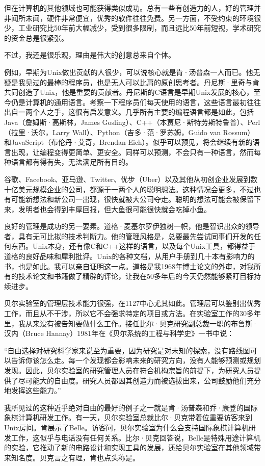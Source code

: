 \documentclass[a4paper,12pt,UTF8,twoside]{ctexbook}
\begin{document}
{{但在计算机的其他领域也可能获得类似成功。总有一些有创造力的人，好的管理并非闻所未闻，硬件非常便宜，优秀的软件往往免费。另一方面，不受约束的环境很少，工业研究比50年前大幅减少，受到很多限制，而且远比50年前短视，学术研究的资金总是很紧张。

不过，我还是很乐观，理由是伟大的创意总来自个体。

例如，早期为Unix做出贡献的人很少，可以说核心就是肯·汤普森一人而已。他无疑是我见过的最棒的程序员，也是无人可以比肩的原创思考者。丹尼斯·里奇与肯共同创造了Unix，他是重要的贡献者。丹尼斯的C语言是早期Unix发展的核心，至今仍是计算机的通用语言。考察一下程序员们每天使用的语言，这些语言最初往往出自一两个人之手，这很有启发意义。几乎所有主要的编程语言都是如此，包括Java（詹姆斯·高斯林，James Gosling）、C++（本贾尼·斯特劳斯特鲁普）、Perl（拉里·沃尔，Larry Wall）、Python（吉多·范·罗苏姆，Guido van Rossum）和JavaScript（布伦丹·艾奇，Brendan Eich）。似乎可以预见，将会继续有新的语言出现，让编程变得更简单、更安全。同样可以预测，不会只有一种语言，然而每种语言都有得有失，无法满足所有目的。

谷歌、Facebook、亚马逊、Twitter、优步（Uber）以及其他从初创企业发展到数十亿美元规模企业的公司，都源于一两个人的聪明想法。这种情况会更多，不过也有可能新想法和新公司一出现，很快就被大公司夺走。聪明的想法可能会被保留下来，发明者也会得到丰厚回报，但大鱼很可能很快就会吃掉小鱼。

良好的管理是成功的另一要素。道格·麦基尔罗伊独树一帜，他是智识出众的领导者，具有无可比拟的技术判断力。他的管理风格是，总要最先尝试同事们开发的任何东西。Unix本身，还有像C和C++这样的语言，以及每个Unix工具，都得益于道格的良好品味和犀利批评。Unix的各种文档，从用户手册到几十本有影响力的书，也是如此。我可以亲自证明这一点。道格是我1968年博士论文的外审，对我所有的技术论文和书籍做了精辟的评论，让我在50多年后的今天仍然能够紧盯目标持续进步。

贝尔实验室的管理层技术能力很强，在1127中心尤其如此。管理层可以鉴别出优秀工作，而且从不干涉，所以它不会强求特定的项目或方法。在实验室工作的30多年里，我从来没有被告知要做什么工作。接任比尔·贝克研究副总裁一职的布鲁斯·汉内（Bruce Hannay）1981年在《贝尔系统的工程与科学史》一书中说：

“自由选择对研究科学家来说至为重要，因为研究是对未知的探索，没有路线图可以告诉你该怎么走。每一个发现都会影响未来的研究方向，没有人能够预测或规划发现。因此，贝尔实验室的研究管理人员在符合机构宗旨的前提下，为研究人员提供了尽可能大的自由度。研究人员都因其创造力而被选拔出来，公司鼓励他们充分地发挥这些能力。”



我所见过的这种近乎绝对自由的最好的例子之一就是肯·汤普森和乔·康登的国际象棋计算机研发工作。有一天，贝尔实验室总裁比尔·贝克带着位重要访客来到Unix房间。肯展示了Belle。访客问，贝尔实验室为什么会支持国际象棋计算机研发工作，这似乎与电话没有任何关系。比尔·贝克回答说，Belle是特殊用途计算机的实验，它推动了新的电路设计和实现工具的发展，还给贝尔实验室在其他领域带来知名度。贝克言之有理，肯也点头称是。

}}
\end{document}

